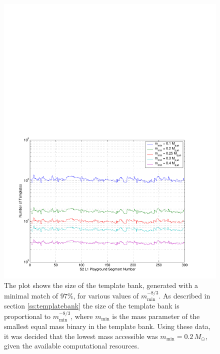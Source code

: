 \begin{figure}[p]
\begin{center}
\includegraphics[width=\linewidth]{figures/result/bank_size}
\end{center}
\caption[MACHO Template Bank Size for Various Lower Masses]{%
\label{f:bank_size}
The plot shows the size of the template bank, generated with a minimal match
of $97\%$, for various values of $m_\mathrm{min}^{-8/3}$. As described in
section \ref{ss:templatebank} the size of the template bank is proportional to
$m_\mathrm{min}^{-8/3}$, where $m_\mathrm{min}$ is the mass parameter of the
smallest equal mass binary in the template bank. Using these data, it was
decided that the lowest mass accessible was $m_\mathrm{min} = 0.2\,M_\odot$,
given the available computational resources.}
\end{figure}

